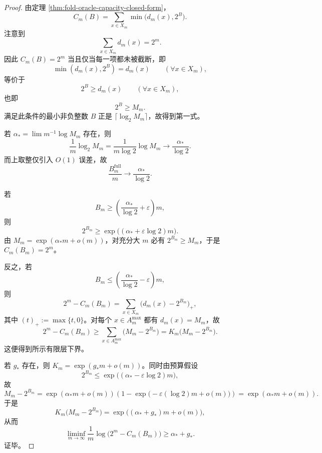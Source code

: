 \begin{proof}
由定理 \ref{thm:fold-oracle-capacity-closed-form}，
\[
C_m(B)=\sum_{x\in X_m}\min\bigl(d_m(x),2^B\bigr).
\]
注意到
\[
\sum_{x\in X_m}d_m(x)=2^m.
\]
因此 \(C_m(B)=2^m\) 当且仅当每一项都未被截断，即
\[
\min(d_m(x),2^B)=d_m(x)\qquad(\forall x\in X_m),
\]
等价于
\[
2^B\ge d_m(x)\qquad(\forall x\in X_m),
\]
也即
\[
2^B\ge M_m.
\]
满足此条件的最小非负整数 \(B\) 正是 \(\lceil \log_2 M_m\rceil\)，故得到第一式。
\par
若 \(\alpha_*=\lim m^{-1}\log M_m\) 存在，则
\[
\frac1m\log_2 M_m=\frac{1}{m\log2}\log M_m\to \frac{\alpha_*}{\log2}.
\]
而上取整仅引入 \(O(1)\) 误差，故
\[
\frac{B_m^{\mathrm{full}}}{m}\to \frac{\alpha_*}{\log2}.
\]
\par
若
\[
B_m\ge \left(\frac{\alpha_*}{\log2}+\varepsilon\right)m,
\]
则
\[
2^{B_m}\ge \exp\!\bigl((\alpha_*+\varepsilon\log2)m\bigr).
\]
由 \(M_m=\exp(\alpha_*m+o(m))\)，对充分大 \(m\) 必有 \(2^{B_m}\ge M_m\)，于是 \(C_m(B_m)=2^m\)。
\par
反之，若
\[
B_m\le \left(\frac{\alpha_*}{\log2}-\varepsilon\right)m,
\]
则
\[
2^m-C_m(B_m)
=
\sum_{x\in X_m}\bigl(d_m(x)-2^{B_m}\bigr)_+,
\]
其中 \((t)_+:=\max\{t,0\}\)。对每个 \(x\in A_m^{\max}\) 都有 \(d_m(x)=M_m\)，故
\[
2^m-C_m(B_m)\ge \sum_{x\in A_m^{\max}}\bigl(M_m-2^{B_m}\bigr)
=
K_m\bigl(M_m-2^{B_m}\bigr).
\]
这便得到所示有限层下界。
\par
若 \(g_*\) 存在，则 \(K_m=\exp(g_*m+o(m))\)。同时由预算假设
\[
2^{B_m}\le \exp\!\bigl((\alpha_*-\varepsilon\log2)m\bigr),
\]
故
\[
M_m-2^{B_m}
=
\exp(\alpha_*m+o(m))
\left(1-\exp\!\bigl(-\varepsilon(\log2)m+o(m)\bigr)\right)
=
\exp(\alpha_*m+o(m)).
\]
于是
\[
K_m\bigl(M_m-2^{B_m}\bigr)=\exp\!\bigl((\alpha_*+g_*)m+o(m)\bigr),
\]
从而
\[
\liminf_{m\to\infty}\frac1m\log\bigl(2^m-C_m(B_m)\bigr)\ge \alpha_*+g_*.
\]
证毕。
\end{proof}






